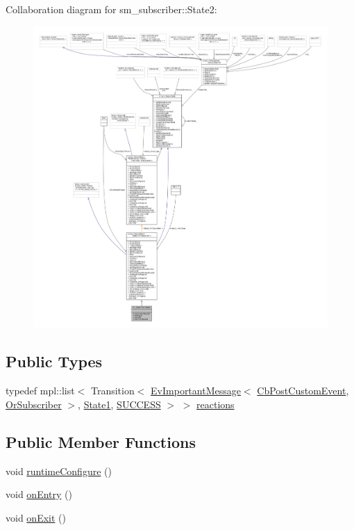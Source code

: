 Collaboration diagram for sm\+\_\+subscriber\+:\+:State2\+:
\nopagebreak
\begin{figure}[H]
\begin{center}
\leavevmode
\includegraphics[width=350pt]{structsm__subscriber_1_1State2__coll__graph}
\end{center}
\end{figure}
\subsection*{Public Types}
\begin{DoxyCompactItemize}
\item 
typedef mpl\+::list$<$ Transition$<$ \hyperlink{structsm__subscriber_1_1EvImportantMessage}{Ev\+Important\+Message}$<$ \hyperlink{classsm__subscriber_1_1CbPostCustomEvent}{Cb\+Post\+Custom\+Event}, \hyperlink{classsm__subscriber_1_1OrSubscriber}{Or\+Subscriber} $>$, \hyperlink{structsm__subscriber_1_1State1}{State1}, \hyperlink{structsmacc_1_1default__transition__tags_1_1SUCCESS}{S\+U\+C\+C\+E\+SS} $>$ $>$ \hyperlink{structsm__subscriber_1_1State2_abba890ef81d38401fdbbefb3df16d6c9}{reactions}
\end{DoxyCompactItemize}
\subsection*{Public Member Functions}
\begin{DoxyCompactItemize}
\item 
void \hyperlink{structsm__subscriber_1_1State2_a995d0c28244484928180a42fa184fede}{runtime\+Configure} ()
\item 
void \hyperlink{structsm__subscriber_1_1State2_a347f3fae536365efa9bb7999d18bfa03}{on\+Entry} ()
\item 
void \hyperlink{structsm__subscriber_1_1State2_ab9fa266b71e61d08dfff9aa2a5ce1eb7}{on\+Exit} ()
\end{DoxyCompactItemize}
